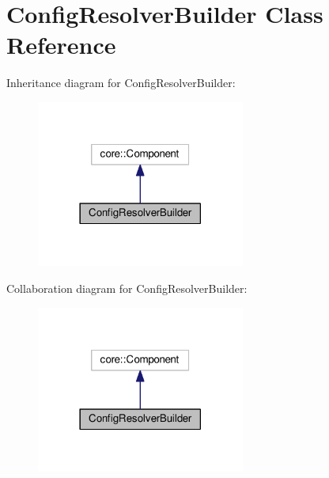 \hypertarget{classConfigResolverBuilder}{\section{Config\+Resolver\+Builder Class Reference}
\label{classConfigResolverBuilder}
}


Inheritance diagram for Config\+Resolver\+Builder\+:
\nopagebreak
\begin{figure}[H]
\begin{center}
\leavevmode
\includegraphics[width=194pt]{classConfigResolverBuilder__inherit__graph}
\end{center}
\end{figure}


Collaboration diagram for Config\+Resolver\+Builder\+:
\nopagebreak
\begin{figure}[H]
\begin{center}
\leavevmode
\includegraphics[width=194pt]{classConfigResolverBuilder__coll__graph}
\end{center}
\end{figure}
